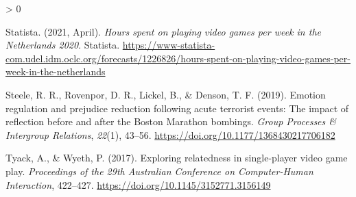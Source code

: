 \documentclass[
  english,
  man, noextraspace,floatsintext]{apa6}
\newlength{\cslhangindent}
\newenvironment{CSLReferences}[2] %
 {%
  \setlength{\parindent}{0pt}
  \ifodd #1 \everypar{\setlength{\hangindent}{\cslhangindent}}\ignorespaces\fi
  \ifnum #2 > 0
  \setlength{\parskip}{#2\baselineskip}
  \fi
 }%
 {}
\begin{document}
\begin{CSLReferences}{1}{0}
\leavevmode\hypertarget{ref-statistaHoursSpentPlaying2021}{}%
Statista. (2021, April). \emph{Hours spent on playing video games per week in the {Netherlands} 2020}. {Statista}. \url{https://www-statista-com.udel.idm.oclc.org/forecasts/1226826/hours-spent-on-playing-video-games-per-week-in-the-netherlands}

\leavevmode\hypertarget{ref-steeleEmotionRegulationPrejudice2019}{}%
Steele, R. R., Rovenpor, D. R., Lickel, B., \& Denson, T. F. (2019). Emotion regulation and prejudice reduction following acute terrorist events: {The} impact of reflection before and after the {Boston Marathon} bombings. \emph{Group Processes \& Intergroup Relations}, \emph{22}(1), 43--56. \url{https://doi.org/10.1177/1368430217706182}

\leavevmode\hypertarget{ref-tyackExploringRelatednessSingleplayer2017}{}%
Tyack, A., \& Wyeth, P. (2017). Exploring relatedness in single-player video game play. \emph{Proceedings of the 29th {Australian Conference} on {Computer}-{Human Interaction}}, 422--427. \url{https://doi.org/10.1145/3152771.3156149}

\end{CSLReferences}
\end{document}
